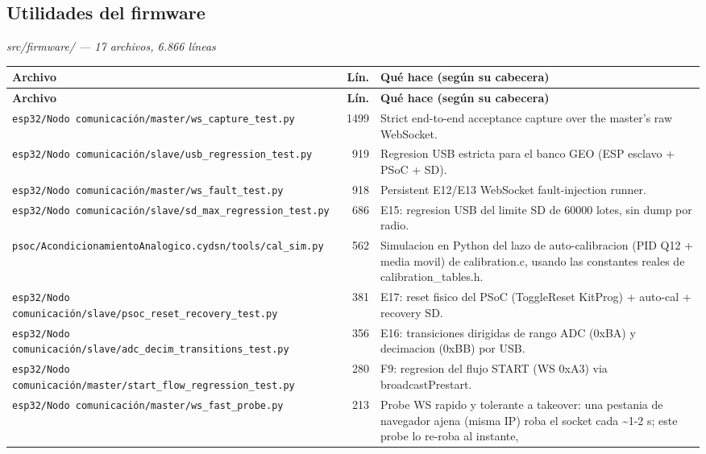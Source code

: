 \subsection{Utilidades del firmware}
\textit{\small src/firmware/ --- 17 archivos, 6.866 l\'ineas}
\footnotesize
\begin{longtable}{@{}p{5.4cm} r p{8.6cm}@{}}
\toprule \textbf{Archivo} & \textbf{L\'in.} & \textbf{Qu\'e hace (seg\'un su cabecera)} \\ \midrule
\endfirsthead
\toprule \textbf{Archivo} & \textbf{L\'in.} & \textbf{Qu\'e hace (seg\'un su cabecera)} \\ \midrule
\endhead
\bottomrule \endfoot
\texttt{\scriptsize esp32/Nodo comunicación/master/ws\_capture\_test.py} & 1499 & Strict end-to-end acceptance capture over the master's raw WebSocket. \\
\texttt{\scriptsize esp32/Nodo comunicación/slave/usb\_regression\_test.py} & 919 & Regresion USB estricta para el banco GEO (ESP esclavo + PSoC + SD). \\
\texttt{\scriptsize esp32/Nodo comunicación/master/ws\_fault\_test.py} & 918 & Persistent E12/E13 WebSocket fault-injection runner. \\
\texttt{\scriptsize esp32/Nodo comunicación/slave/sd\_max\_regression\_test.py} & 686 & E15: regresion USB del limite SD de 60000 lotes, sin dump por radio. \\
\texttt{\scriptsize psoc/AcondicionamientoAnalogico.cydsn/tools/cal\_sim.py} & 562 & Simulacion en Python del lazo de auto-calibracion (PID Q12 + media movil) de calibration.c, usando las constantes reales de calibration\_tables.h. \\
\texttt{\scriptsize esp32/Nodo comunicación/slave/psoc\_reset\_recovery\_test.py} & 381 & E17: reset fisico del PSoC (ToggleReset KitProg) + auto-cal + recovery SD. \\
\texttt{\scriptsize esp32/Nodo comunicación/slave/adc\_decim\_transitions\_test.py} & 356 & E16: transiciones dirigidas de rango ADC (0xBA) y decimacion (0xBB) por USB. \\
\texttt{\scriptsize esp32/Nodo comunicación/master/start\_flow\_regression\_test.py} & 280 & F9: regresion del flujo START (WS 0xA3) via broadcastPrestart. \\
\texttt{\scriptsize esp32/Nodo comunicación/master/ws\_fast\_probe.py} & 213 & Probe WS rapido y tolerante a takeover: una pestania de navegador ajena (misma IP) roba el socket cada \textasciitilde{}1-2 s; este probe lo re-roba al instante, \\

\end{longtable}
